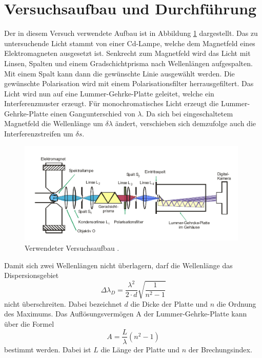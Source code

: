 \section{Versuchsaufbau und Durchführung}
\label{sec:Durchführung}

Der in diesem Versuch verwendete Aufbau ist in Abbildung \ref{fig:Aufbau} dargestellt. Das
zu untersuchende Licht stammt von einer Cd-Lampe, welche dem Magnetfeld eines Elektromagneten
ausgesetzt ist. Senkrecht zum Magnetfeld wird das Licht mit Linsen, Spalten und einem
Gradschichtprisma nach Wellenlängen aufgespalten. Mit einem Spalt kann dann die gewünschte Linie
ausgewählt werden. Die gewünschte Polarisation wird mit einem Polarisationsfilter herrausgefiltert.
Das Licht wird nun auf eine Lummer-Gehrke-Platte geleitet, welche ein Interferenzmuster erzeugt.
Für monochromatisches Licht erzeugt die Lummer-Gehrke-Platte einen Gangunterschied von $\lambda$.
Da sich bei eingeschaltetem Magnetfeld die Wellenlänge um $\delta \lambda$ ändert, verschieben sich
demzufolge auch die Interferenzstreifen um $\delta s$.
\begin{figure}
  \centering
  \includegraphics[width=11cm]{Aufbau.png}
  \caption{Verwendeter Versuchsaufbau \cite{skript}.}
  \label{fig:Aufbau}
\end{figure}

Damit sich zwei Wellenlängen nicht überlagern, darf die Wellenlänge
das Dispersionsgebiet
\begin{equation}
  \Delta\lambda_D=\frac{\lambda^2}{2\cdot d}\sqrt{\frac{1}{n^2-1}}
  \label{eqn:dispersion}
\end{equation}
nicht überschreiten. Dabei bezeichnet $d$ die Dicke der Platte und
$n$ die Ordnung des Maximums.
Das Auflösungsvermögen A der Lummer-Gehrke-Platte kann über die Formel
\begin{equation}
  A=\frac{L}{\lambda}(n^2-1)
  \label{eqn:Auflösung}
\end{equation}
bestimmt werden. Dabei ist $L$ die Länge der Platte und $n$ der Brechungsindex.

